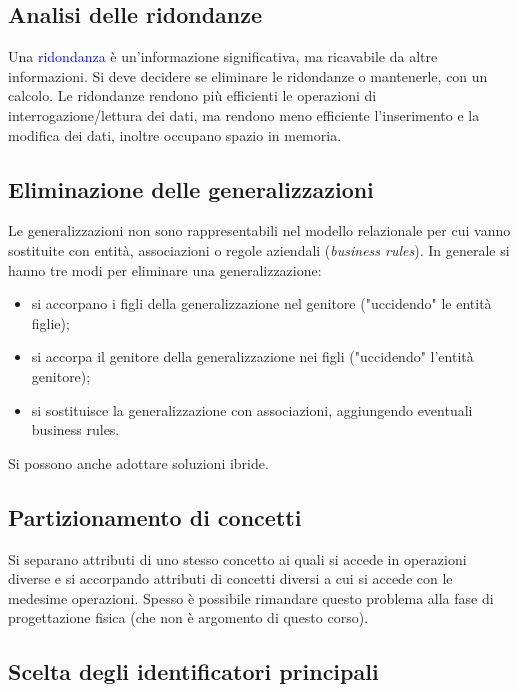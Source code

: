 \subsection{Analisi delle ridondanze}

Una \textcolor{blue}{ridondanza} è un'informazione significativa, ma ricavabile da altre informazioni. Si deve decidere se eliminare le ridondanze o mantenerle, con un calcolo. Le ridondanze rendono più efficienti le operazioni di interrogazione/lettura dei dati, ma rendono meno efficiente l'inserimento e la modifica dei dati, inoltre occupano spazio in memoria.

\subsection{Eliminazione delle generalizzazioni}

Le generalizzazioni non sono rappresentabili nel modello relazionale per cui vanno sostituite con entità, associazioni o regole aziendali (\textit{business rules}). In generale si hanno tre modi per eliminare una generalizzazione:

\begin{itemize}
    \item si accorpano i figli della generalizzazione nel genitore ("uccidendo" le entità figlie);
    \item si accorpa il genitore della generalizzazione nei figli ("uccidendo" l'entità genitore);
    \item si sostituisce la generalizzazione con associazioni, aggiungendo eventuali business rules.
\end{itemize}

Si possono anche adottare soluzioni ibride.

\subsection{Partizionamento di concetti}

Si separano attributi di uno stesso concetto ai quali si accede in operazioni diverse e si accorpando attributi di concetti diversi a cui si accede con le medesime operazioni. Spesso è possibile rimandare questo problema alla fase di progettazione fisica (che non è argomento di questo corso).

\subsection{Scelta degli identificatori principali}


